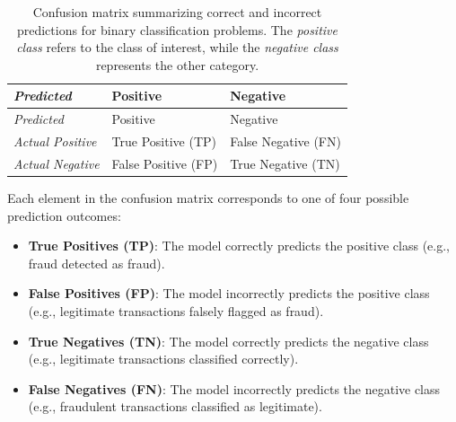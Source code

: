 \documentclass[
]{book}
\providecommand{\tightlist}{%
  \setlength{\itemsep}{0pt}\setlength{\parskip}{0pt}}
\theoremstyle{definition}
\theoremstyle{definition}
\theoremstyle{definition}
\theoremstyle{definition}
\theoremstyle{remark}
\begin{document}
\begin{longtable}[]{@{}
  >{\raggedright\arraybackslash}p{}
  >{\raggedright\arraybackslash}p{}
  >{\raggedright\arraybackslash}p{}@{}}
\caption{\label{tab:confusion-matrix} Confusion matrix summarizing correct and incorrect predictions for binary classification problems. The \emph{positive class} refers to the class of interest, while the \emph{negative class} represents the other category.}\tabularnewline
\toprule\noalign{}
\begin{minipage}[b]{\linewidth}\raggedright
\emph{Predicted}
\end{minipage} & \begin{minipage}[b]{\linewidth}\raggedright
Positive
\end{minipage} & \begin{minipage}[b]{\linewidth}\raggedright
Negative
\end{minipage} \\
\midrule\noalign{}
\endfirsthead
\toprule\noalign{}
\begin{minipage}[b]{\linewidth}\raggedright
\emph{Predicted}
\end{minipage} & \begin{minipage}[b]{\linewidth}\raggedright
Positive
\end{minipage} & \begin{minipage}[b]{\linewidth}\raggedright
Negative
\end{minipage} \\
\midrule\noalign{}
\endhead
\bottomrule\noalign{}
\endlastfoot
\emph{Actual Positive} & { True Positive (TP) } & { False Negative (FN) } \\
\emph{Actual Negative} & { False Positive (FP) } & { True Negative (TN) } \\
\end{longtable}

Each element in the confusion matrix corresponds to one of four possible prediction outcomes:

\begin{itemize}
\tightlist
\item
  \textbf{True Positives (TP)}: The model correctly predicts the positive class (e.g., fraud detected as fraud).\\
\item
  \textbf{False Positives (FP)}: The model incorrectly predicts the positive class (e.g., legitimate transactions falsely flagged as fraud).\\
\item
  \textbf{True Negatives (TN)}: The model correctly predicts the negative class (e.g., legitimate transactions classified correctly).\\
\item
  \textbf{False Negatives (FN)}: The model incorrectly predicts the negative class (e.g., fraudulent transactions classified as legitimate).
\end{itemize}
\end{document}
